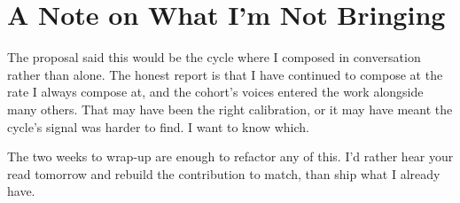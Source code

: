 \documentclass[11pt,letterpaper]{article}
\begin{document}
\section{A Note on What I'm Not Bringing}

The proposal said this would be the cycle where I composed in conversation rather than alone. The honest report is that I have continued to compose at the rate I always compose at, and the cohort's voices entered the work alongside many others. That may have been the right calibration, or it may have meant the cycle's signal was harder to find. I want to know which.

The two weeks to wrap-up are enough to refactor any of this. I'd rather hear your read tomorrow and rebuild the contribution to match, than ship what I already have.

\end{document}
